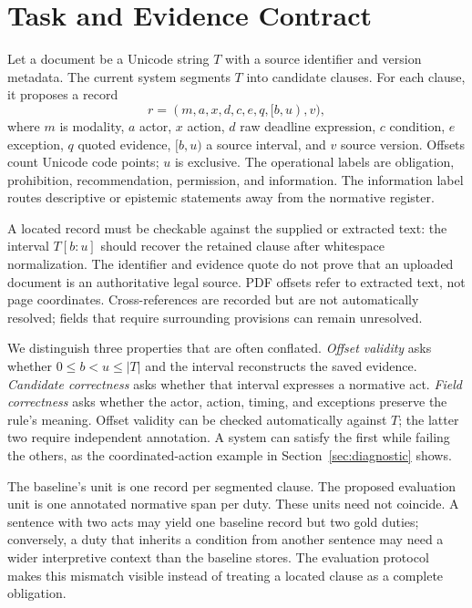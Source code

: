 \documentclass[11pt,a4paper]{article}
\begin{document}
\section{Task and Evidence Contract}
Let a document be a Unicode string $T$ with a source identifier and version metadata. The current system segments $T$ into candidate clauses. For each clause, it proposes a record
\[
r=(m,a,x,d,c,e,q,[b,u),v),
\]
where $m$ is modality, $a$ actor, $x$ action, $d$ raw deadline expression, $c$ condition, $e$ exception, $q$ quoted evidence, $[b,u)$ a source interval, and $v$ source version. Offsets count Unicode code points; $u$ is exclusive. The operational labels are obligation, prohibition, recommendation, permission, and information. The information label routes descriptive or epistemic statements away from the normative register.

A located record must be checkable against the supplied or extracted text: the interval $T[b:u]$ should recover the retained clause after whitespace normalization. The identifier and evidence quote do not prove that an uploaded document is an authoritative legal source. PDF offsets refer to extracted text, not page coordinates. Cross-references are recorded but are not automatically resolved; fields that require surrounding provisions can remain unresolved.

We distinguish three properties that are often conflated. \emph{Offset validity} asks whether $0\leq b<u\leq |T|$ and the interval reconstructs the saved evidence. \emph{Candidate correctness} asks whether that interval expresses a normative act. \emph{Field correctness} asks whether the actor, action, timing, and exceptions preserve the rule's meaning. Offset validity can be checked automatically against $T$; the latter two require independent annotation. A system can satisfy the first while failing the others, as the coordinated-action example in Section~\ref{sec:diagnostic} shows.

The baseline's unit is one record per segmented clause. The proposed evaluation unit is one annotated normative span per duty. These units need not coincide. A sentence with two acts may yield one baseline record but two gold duties; conversely, a duty that inherits a condition from another sentence may need a wider interpretive context than the baseline stores. The evaluation protocol makes this mismatch visible instead of treating a located clause as a complete obligation.
\end{document}
